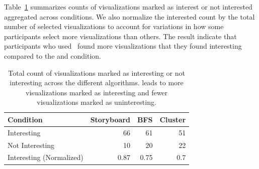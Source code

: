 Table~\ref{table:interestingScore} summarizes counts of visualizations marked as interest or not interested aggregated across conditions. We also normalize the interested count by the total number of selected visualizations to account for variations in how some participants select more visualizations than others. The result indicate that participants who used \system\ found more visualizations that they found interesting compared to the \BFS  and \cluster condition.
\begin{table}[ht!]
	\centering
	\begin{tabular}{lrrr}
	\hline
	 Condition             &   Storyboard &   BFS &   Cluster \\
	\hline
	 Interesting            &  \cellcolor{blue!25}       66    & 61    &      51   \\
	 Not Interesting        &  \cellcolor{blue!25}       10    & 20    &      22   \\
	 Interesting (Normalized) &   \cellcolor{blue!25}       0.87 &  0.75 &       0.7 \\
	\hline
	\end{tabular}
	\caption{Total count of visualizations marked as interesting or not interesting across the different algorithms. \system leads to more visualizations marked as interesting and fewer visualizations marked as uninteresting.}
	\label{table:interestingScore}
	\vspace{-20pt}
\end{table}
